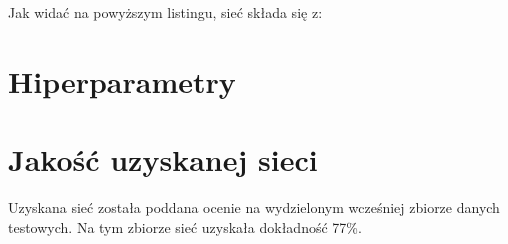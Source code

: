 \documentclass[11pt]{article}
\begin{document}
	Jak widać na powyższym listingu, sieć składa się z:


	

	\section{Hiperparametry}

	\section {Jakość uzyskanej sieci}
	Uzyskana sieć została poddana ocenie na wydzielonym wcześniej zbiorze danych testowych.
	Na tym zbiorze sieć uzyskała dokładność 77\%.
\end{document}
